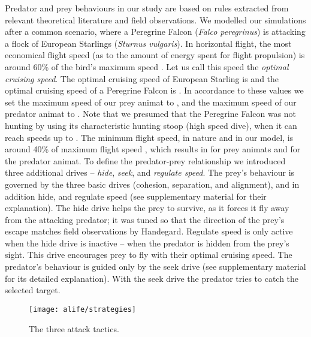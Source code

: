 Predator and prey behaviours in our study are based on rules extracted from relevant theoretical literature and field observations. We modelled our simulations after a common scenario, where a Peregrine Falcon (\emph{Falco peregrinus}) is attacking a flock of European Starlings (\emph{Sturnus vulgaris}). In horizontal flight, the most economical flight speed (as to the amount of energy spent for flight propulsion) is around 60\% of the bird's maximum speed \cite{tennekes2009simple}. Let us call this speed the \emph{optimal cruising speed}. The optimal cruising speed of European Starling is  and the optimal cruising speed of a Peregrine Falcon is  \cite{tennekes2009simple}. In accordance to these values we set the maximum speed of our prey animat to , and the maximum speed of our predator animat to . Note that we presumed that the Peregrine Falcon was not hunting by using its characteristic hunting stoop (high speed dive), when it can reach speeds up to  \cite{tucker1998gliding}. The minimum flight speed, in nature and in our model, is around 40\% of maximum flight speed \cite{tennekes2009simple}, which results in  for prey animats and  for the predator animat. To define the predator-prey relationship we introduced three additional drives -- \emph{hide}, \emph{seek}, and \emph{regulate speed}. The prey's behaviour is governed by the three basic drives (cohesion, separation, and alignment), and in addition hide, and regulate speed (see supplementary material for their explanation). The hide drive helps the prey to survive, as it forces it fly away from the attacking predator; it was tuned so that the direction of the prey's escape matches field observations by Handegard\etal \cite{handegard2012dynamics}. Regulate speed is only active when the hide drive is inactive -- when the predator is hidden from the prey's sight. This drive encourages prey to fly with their optimal cruising speed. The predator's behaviour is guided only by the seek drive (see supplementary material for its detailed explanation). With the seek drive the predator tries to catch the selected target.

\begin{figure}
  \texttt{[image: alife/strategies]}
  \caption{The three attack tactics.}
  \label{figStrategies}
\end{figure}

